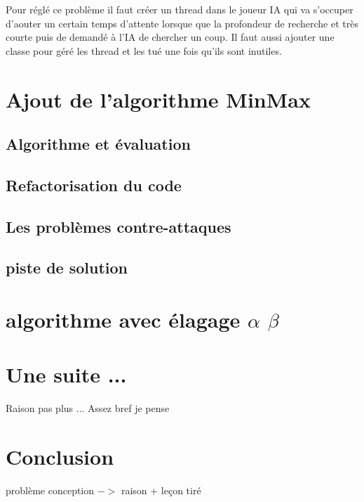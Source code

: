 \documentclass[12pt, legalpaper]{article}
\begin{document}
Pour réglé ce problème il faut créer un thread dans le joueur IA qui va s'occuper
d'aouter un certain temps d'attente lorsque que la profondeur de recherche et très courte
puis de demandé à l'IA de chercher un coup. Il faut aussi ajouter une classe pour 
géré les thread et les tué une fois qu'ils sont inutiles.

\newpage


\section{Ajout de l'algorithme MinMax}
\subsection{Algorithme et évaluation}
\subsection{Refactorisation du code}
\subsection{Les problèmes contre-attaques}
\subsection{piste de solution}

\newpage

\section{algorithme avec élagage $\alpha$ $\beta$ }

\newpage

\section{Une suite ...}
Raison pas plus ...
Assez bref je pense


\section{Conclusion}
problème conception $->$ raison + leçon tiré
\end{document}
